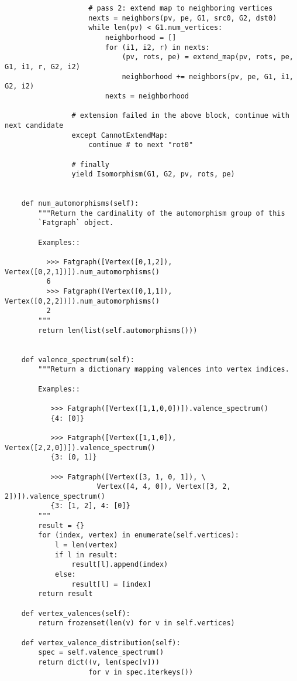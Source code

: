 \begin{lstlisting}
                    # pass 2: extend map to neighboring vertices
                    nexts = neighbors(pv, pe, G1, src0, G2, dst0)
                    while len(pv) < G1.num_vertices:
                        neighborhood = []
                        for (i1, i2, r) in nexts:
                            (pv, rots, pe) = extend_map(pv, rots, pe, G1, i1, r, G2, i2)
                            neighborhood += neighbors(pv, pe, G1, i1, G2, i2)
                        nexts = neighborhood

                # extension failed in the above block, continue with next candidate
                except CannotExtendMap:
                    continue # to next "rot0"

                # finally
                yield Isomorphism(G1, G2, pv, rots, pe)


    def num_automorphisms(self):
        """Return the cardinality of the automorphism group of this
        `Fatgraph` object.

        Examples::

          >>> Fatgraph([Vertex([0,1,2]), Vertex([0,2,1])]).num_automorphisms()
          6
          >>> Fatgraph([Vertex([0,1,1]), Vertex([0,2,2])]).num_automorphisms()
          2
        """
        return len(list(self.automorphisms()))
    

    def valence_spectrum(self):
        """Return a dictionary mapping valences into vertex indices.

        Examples::

           >>> Fatgraph([Vertex([1,1,0,0])]).valence_spectrum()
           {4: [0]}

           >>> Fatgraph([Vertex([1,1,0]), Vertex([2,2,0])]).valence_spectrum()
           {3: [0, 1]}

           >>> Fatgraph([Vertex([3, 1, 0, 1]), \
                      Vertex([4, 4, 0]), Vertex([3, 2, 2])]).valence_spectrum()
           {3: [1, 2], 4: [0]}
        """
        result = {}
        for (index, vertex) in enumerate(self.vertices):
            l = len(vertex)
            if l in result:
                result[l].append(index)
            else:
                result[l] = [index]
        return result

    def vertex_valences(self):
        return frozenset(len(v) for v in self.vertices)

    def vertex_valence_distribution(self):
        spec = self.valence_spectrum()
        return dict((v, len(spec[v]))
                    for v in spec.iterkeys())
\end{lstlisting}



